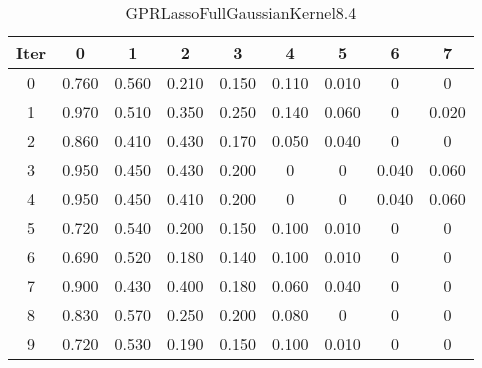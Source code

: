 \begin{table}
	\begin{center}
		\begin{tabular}{|c|c|c|c|c|c|c|c|c|}
			\hline
			Iter & 0 & 1 & 2 & 3 & 4 & 5 & 6 & 7 \\
			\hline
			0 & 0.760 & 0.560 & 0.210 & 0.150 & 0.110 & 0.010 & 0 & 0 \\
			\hline
			1 & 0.970 & 0.510 & 0.350 & 0.250 & 0.140 & 0.060 & 0 & 0.020 \\
			\hline
			2 & 0.860 & 0.410 & 0.430 & 0.170 & 0.050 & 0.040 & 0 & 0 \\
			\hline
			3 & 0.950 & 0.450 & 0.430 & 0.200 & 0 & 0 & 0.040 & 0.060 \\
			\hline
			4 & 0.950 & 0.450 & 0.410 & 0.200 & 0 & 0 & 0.040 & 0.060 \\
			\hline
			5 & 0.720 & 0.540 & 0.200 & 0.150 & 0.100 & 0.010 & 0 & 0 \\
			\hline
			6 & 0.690 & 0.520 & 0.180 & 0.140 & 0.100 & 0.010 & 0 & 0 \\
			\hline
			7 & 0.900 & 0.430 & 0.400 & 0.180 & 0.060 & 0.040 & 0 & 0 \\
			\hline
			8 & 0.830 & 0.570 & 0.250 & 0.200 & 0.080 & 0 & 0 & 0 \\
			\hline
			9 & 0.720 & 0.530 & 0.190 & 0.150 & 0.100 & 0.010 & 0 & 0 \\
			\hline
		\end{tabular}
	\end{center}
	\caption{GPRLassoFullGaussianKernel8.4}
\end{table}